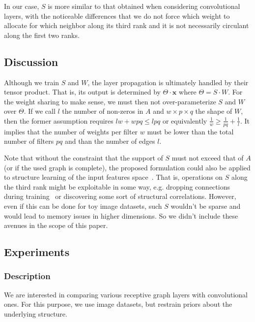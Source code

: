 In our case, $S$ is more similar to that obtained when considering convolutional layers, with the noticeable differences that we do not force which weight to allocate for which neighbor along its third rank and it is not necessarily circulant along the first two ranks.

\subsection{Discussion}
\label{discussion}

Although we train $S$ and $W$, the layer propagation is ultimately handled by their tensor product. That is, its output is determined by $\Theta \cdot \mathbf{x}$ where $\Theta = S \cdot W$. For the weight sharing to make sense, we must then not over-parameterize $S$ and $W$ over $\Theta$. If we call $l$ the number of non-zeros in $A$ and $w\times p \times q$ the shape of $W$, then the former assumption requires $lw + wpq \leq lpq$ or equivalently $\frac{1}{w} \geq \frac{1}{pq} + \frac{1}{l}$. It implies that the number of weights per filter $w$ must be lower than the total number of filters $pq$ and than the number of edges $l$.%

Note that without the constraint that the support of $S$ must not exceed that of $A$ (or if the used graph is complete), the proposed formulation could also be applied to structure learning of the input features space~\cite{richardson1996discovery,kwok1997constructive}. That is, operations on $S$ along the third rank might be exploitable in some way, e.g. dropping connections during training~\cite{han2015learning} or discovering some sort of structural correlations. However, even if this can be done for toy image datasets, such $S$ wouldn't be sparse and would lead to memory issues in higher dimensions. So we didn't include these avenues in the scope of this paper.

\subsection{Experiments}

\subsubsection*{Description}

We are interested in comparing various receptive graph layers with convolutional ones. For this purpose, we use image datasets, but restrain priors about the underlying structure.

